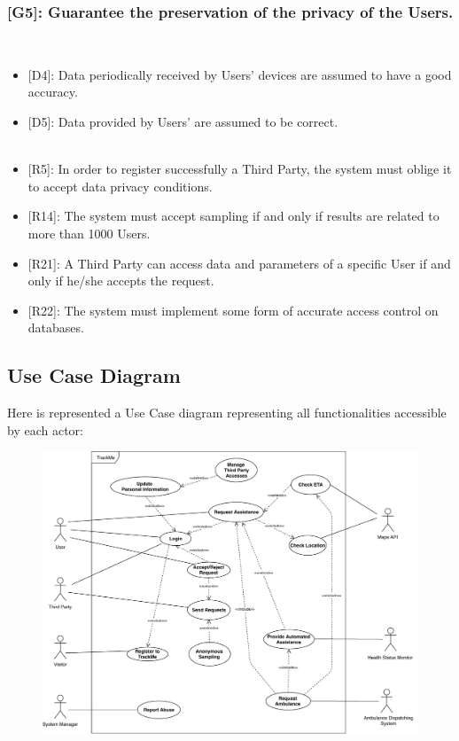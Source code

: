 \documentclass[12pt,a4paper]{article}
\begin{document}
	\subsubsection*{{[}{G5}{]}: Guarantee the preservation of the privacy of the Users.}
	\begin{itemize}\\
		\begin{itemize}
			\item {[D4]}: Data periodically received by Users' devices are assumed to have a good accuracy. 
			\item {[D5]}: Data provided by Users' are assumed to be correct. 
			\\ \\
			\item {[R5]}: In order to register successfully a Third Party, the system must oblige it to accept data privacy conditions.
			\item {[R14]}: The system must accept sampling if and only if results are related to more than 1000 Users.
			\item {[R21]}: A Third Party can access data and parameters of a specific User if and only if he/she accepts the request.
			\item {[R22]}: The system must implement some form of accurate access control on databases.
		\end{itemize}
	\end{itemize}
	
	\newpage
	\subsection{Use Case Diagram}
	Here is represented a Use Case diagram representing all functionalities accessible by each actor:
	\begin{figure}[h]
		\centering
		\includegraphics[width=1.25\linewidth]{Images/use_case_diagram}
		\label{fig:use_case_diagram}
	\end{figure}
	
\end{document}

